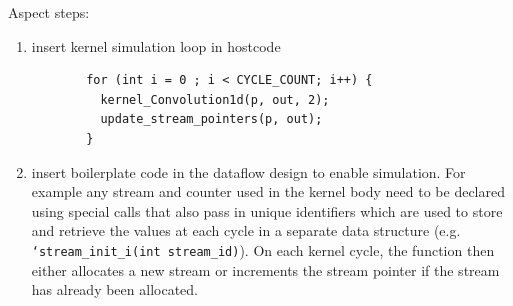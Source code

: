 Aspect steps:

\begin{enumerate}

\item insert kernel simulation loop in hostcode %


\begin{figure}[!h]
\begin{lstlisting}
  for (int i = 0 ; i < CYCLE_COUNT; i++) {
    kernel_Convolution1d(p, out, 2);
    update_stream_pointers(p, out);
  }
\end{lstlisting}
\end{figure}

\item insert boilerplate code in the dataflow design to enable simulation.
  For example any stream and counter used in the kernel body need to
  be declared using special calls that also pass in unique identifiers
  which are used to store and retrieve the values at each cycle in a
  separate data structure (e.g. \texttt{`stream\_init\_i(int
    stream\_id)}). On each kernel cycle, the function then either
  allocates a new stream or increments the stream pointer if the
  stream has already been allocated.

\end{enumerate}

\lstset{style=MaxC}


